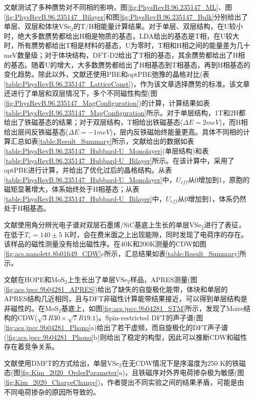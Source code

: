 \documentclass[reprint, aps, prb, showkeys]{revtex4-2}
\begin{document}
文献\cite{PhysRevB.96.235147}测试了多种赝势对不同相的影响，图\ref{fig:PhysRevB.96.235147_ML}、图\ref{fig:PhysRevB.96.235147_Bilayer}和图\ref{fig:PhysRevB.96.235147_Bulk}分别给出了单层、双层和体块VSe$_2$的T/H相能量计算结果。对于单层、双层结构，在U较小时，绝大多数赝势都给出H相是物质的基态，LDA给出的基态是T相，在U较大时，所有赝势都给出T相是材料的基态，U为零时，T相和H相之间的能量差为几十meV数量级；对于体块结构，DFT-D2给出了T相的基态，其余赝势都给出了H相的基态。随着U的增大，大多数赝势都给出了H相基态到T相基态，再到H相基态的变化趋势。除此以外，文献还使用PBE和optPBE弛豫的晶格对比(表\ref{table:PhysRevB.96.235147_LatticeConst})，作为该文章选择赝势的标准。该文章还进行了单层和双层情况下，多个不同磁性构型(图\ref{fig:PhysRevB.96.235147_MagConfiguration})的计算，计算结果如表\ref{table:PhysRevB.96.235147_MagConfiguration}所示。对于单层结构，1T和2H都给出了铁磁基态的结果；对于双层结构，T相给出铁磁基态($\Delta E = 2 meV$)，而H相给出层间反铁磁基态($\Delta E = -1 meV$)，层内反铁磁始终能量更高。具体不同相的计算汇总如表\ref{table:Result_Summary}所示，文献给出的数据如表\ref{table:PhysRevB.96.235147_Hubbard-U_Monolayer}(单层结构)和表\ref{table:PhysRevB.96.235147_Hubbard-U_Bilayer}所示。在该计算中，采用了optPBE进行计算，并给出了优化过后的晶格结构。从表\ref{table:PhysRevB.96.235147_Hubbard-U_Monolayer}中，$U_{eff}$从0增加到1，原胞的磁矩显著增大，体系始终处于H相基态；从表\ref{table:PhysRevB.96.235147_Hubbard-U_Bilayer}中，$U_{eff}$从0增加到1，体系仍然处于H相基态。

文献\cite{doi:10.1021/acs.nanolett.8b01649}使用角分辨光电子谱对双层石墨烯/SiC基底上生长的单层VSe$_2$进行了表征，在低于$T_c = 140 \pm 5$ K时，会在费米面之上出现能隙，同时发现了电荷序的存在。该样品的磁性测量没有给出磁性序。在40K和200K测量的CDW如图\ref{fig:acs.nanolett.8b01649_CDW}c所示，汇总结果如表\ref{table:Result_Summary}所示。

文献\cite{doi:10.1021/acs.jpcc.9b04281}在HOPE和MoS$_2$上生长出了单层VSe$_2$样品，APRES测量(图\ref{fig:acs.jpcc.9b04281_APRES})给出了缺失的自旋极化能带，体块和单层的APRES结构几近相同，且与DFT非磁性计算能带结果接近，可以得到单层结构是非磁性的。在MoS$_2$基底上，如图\ref{fig:acs.jpcc.9b04281_STM}所示，发现了Moire结构的CDW($\sqrt{3}R30 \times \sqrt{7}R19.1$)。Spin-restricted DFT的声子谱(图\ref{fig:acs.jpcc.9b04281_Phono}a)给出了若干虚频，而自旋极化的DFT声子谱(\ref{fig:acs.jpcc.9b04281_Phono}b)则给出了稳定的构型，因此可以推断CDW和磁性存在着竞争关系。

文献\cite{Kim_2020}使用DMFT的方式给出，单层VSe$_2$在无CDW情况下是序温度为250 K的铁磁态(图\ref{fig:Kim_2020_OrderParameter}a)，且铁磁序对外界电荷掺杂极为敏感(图\ref{fig:Kim_2020_ChargeChange})，作者提出不同实验之间的结果矛盾，可能是由不同电荷掺杂的原因所导致的。
\end{document}
